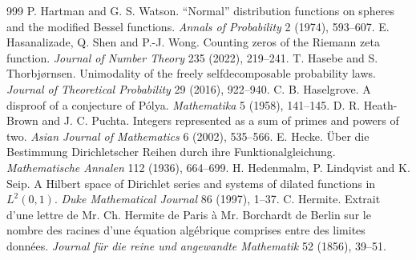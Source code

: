 \begin{thebibliography}{999}
 P. Hartman and G. S. Watson. ``Normal'' distribution functions on spheres and the modified Bessel functions. \emph{Annals of Probability} 2 (1974), 593--607.
 E. Hasanalizade, Q. Shen and P.-J. Wong. Counting zeros of the Riemann zeta function. \emph{Journal of Number Theory} 235 (2022), 219--241.
 T. Hasebe and S. Thorbj{\o}rnsen. Unimodality of the freely selfdecomposable probability laws. \emph{Journal of Theoretical Probability} 29 (2016), 922--940.
 C. B. Haselgrove. A disproof of a conjecture of P\'olya. \emph{Mathematika} 5 (1958), 141--145.
 D. R. Heath-Brown and J. C. Puchta. Integers represented as a sum of primes and powers of two. \emph{Asian Journal of Mathematics} 6 (2002), 535--566.
 E. Hecke. \"Uber die Bestimmung Dirichletscher Reihen durch ihre Funktionalgleichung. \emph{Mathematische Annalen} 112 (1936), 664--699.
 H. Hedenmalm, P. Lindqvist and K. Seip. A Hilbert space of Dirichlet series and systems of dilated functions in $L^2(0,1)$. \emph{Duke Mathematical Journal} 86 (1997), 1--37.
 C. Hermite. Extrait d'une lettre de Mr. Ch. Hermite de Paris \`a Mr. Borchardt de Berlin sur le nombre des racines d'une \'equation alg\'ebrique comprises entre des limites donn\'ees. \emph{Journal f\"ur die reine und angewandte Mathematik} 52 (1856), 39--51.

\end{thebibliography}
